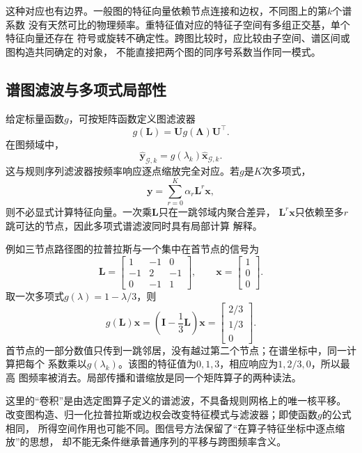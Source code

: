 这种对应也有边界。一般图的特征向量依赖节点连接和边权，不同图上的第$k$个谱系数
没有天然可比的物理频率。重特征值对应的特征子空间有多组正交基，单个特征向量还存在
符号或旋转不确定性。跨图比较时，应比较由子空间、谱区间或图构造共同确定的对象，
不能直接把两个图的同序号系数当作同一模式。

\subsection{谱图滤波与多项式局部性}

给定标量函数$g$，可按矩阵函数定义图滤波器
\[
  g(\bm{L})
  =
  \bm{U}g(\bm{\Lambda})\bm{U}^{\top}.
\]
在图频域中，
\[
  \widehat{\bm{y}}_{\mathcal{G},k}
  =
  g(\lambda_k)\widehat{\bm{x}}_{\mathcal{G},k}.
\]
这与规则序列滤波器按频率响应逐点缩放完全对应。若$g$是$K$次多项式，
\begin{equation}
  \bm{y}
  =
  \sum_{r=0}^{K}\alpha_r\bm{L}^r\bm{x},
  \label{eq:signal-analysis-polynomial-graph-filter}
\end{equation}
则不必显式计算特征向量。一次乘$\bm{L}$只在一跳邻域内聚合差异，
$\bm{L}^r\bm{x}$只依赖至多$r$跳可达的节点，因此多项式谱滤波同时具有局部计算
解释。

例如三节点路径图的拉普拉斯与一个集中在首节点的信号为
\[
  \bm{L}=
  \begin{bmatrix}
    1&-1&0\\
    -1&2&-1\\
    0&-1&1
  \end{bmatrix},
  \qquad
  \bm{x}=
  \begin{bmatrix}1\\0\\0\end{bmatrix}.
\]
取一次多项式$g(\lambda)=1-\lambda/3$，则
\[
  g(\bm{L})\bm{x}
  =
  \left(\bm{I}-\frac{1}{3}\bm{L}\right)\bm{x}
  =
  \begin{bmatrix}2/3\\1/3\\0\end{bmatrix}.
\]
首节点的一部分数值只传到一跳邻居，没有越过第二个节点；在谱坐标中，同一计算把每个
系数乘以$g(\lambda_k)$。该图的特征值为$0,1,3$，相应响应为$1,2/3,0$，所以最高
图频率被消去。局部传播和谱缩放是同一个矩阵算子的两种读法。

这里的“卷积”是由选定图算子定义的谱滤波，不具备规则网格上的唯一核平移。
改变图构造、归一化拉普拉斯或边权会改变特征模式与滤波器；即使函数$g$的公式相同，
所得空间作用也可能不同。图信号方法保留了“在算子特征坐标中逐点缩放”的思想，
却不能无条件继承普通序列的平移与跨图频率含义。

